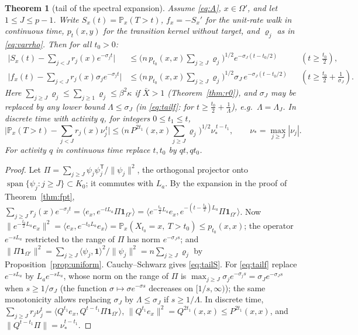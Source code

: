 \documentclass[11pt,a4paper]{article}
\DeclareMathOperator{\spn}{span}
\newcommand{\one}{\mathbf 1}
\newcommand{\PP}{\mathbb P}
\newcommand{\ip}[2]{\langle #1,#2\rangle}
\newcommand{\Xb}{\bar X}
\theoremstyle{plain}
\newtheorem{theorem}{Theorem}[section]
\theoremstyle{definition}
\numberwithin{equation}{section}
\begin{document}
\begin{theorem}[tail of the spectral expansion]\label{thm:tail}
Assume \eqref{eq:A}, $x\in\Omega'$, and let $1\le J\le p-1$. Write $S_x(t)=\PP_x(T>t)$, $f_x=-S_x'$ for the unit-rate walk in continuous time, $p_t(x,y)$ for the transition kernel without target, and $\varrho_j$ as in \eqref{eq:varrho}. Then for all $t_0>0$:
\begin{align}
\Big|S_x(t)-\sum_{j<J}r_j(x)e^{-\sigma_jt}\Big|&\le\Big(n\,p_{t_0}(x,x)\sum_{j\ge J}\varrho_j\Big)^{1/2}e^{-\sigma_J(t-t_0/2)}&&(t\ge\tfrac{t_0}2),\label{eq:tailS}\\
\Big|f_x(t)-\sum_{j<J}r_j(x)\sigma_je^{-\sigma_jt}\Big|&\le\Big(n\,p_{t_0}(x,x)\sum_{j\ge J}\varrho_j\Big)^{1/2}\sigma_J\,e^{-\sigma_J(t-t_0/2)}&&(t\ge\tfrac{t_0}2+\tfrac1{\sigma_J}).\label{eq:tailf}
\end{align}
Here $\sum_{j\ge J}\varrho_j\le\sum_{j\ge1}\varrho_j\le\beta^2\kappa$ if $\Xb>1$ (Theorem~\ref{thm:r0}), and $\sigma_J$ may be replaced by any lower bound $\Lambda\le\sigma_J$ (in \eqref{eq:tailf}: for $t\ge\frac{t_0}2+\frac1\Lambda$), e.g.\ $\Lambda=\Lambda_J$.
In discrete time with activity $q$, for integers $0\le t_1\le t$,
\begin{equation}\label{eq:taildisc}
\Big|\PP_x(T>t)-\sum_{j<J}r_j(x)\nu_j^{\,t}\Big|\le\Big(n\,P^{2t_1}(x,x)\sum_{j\ge J}\varrho_j\Big)^{1/2}\nu_*^{\,t-t_1},\qquad\nu_*=\max_{j\ge J}|\nu_j| .
\end{equation}
For activity $q$ in continuous time replace $t,t_0$ by $qt,qt_0$.
\end{theorem}
\begin{proof}
Let $\Pi=\sum_{j\ge J}\psi_j\psi_j^{\mathsf T}/\|\psi_j\|^2$, the orthogonal projector onto $\spn\{\psi_j:j\ge J\}\subset K_0$; it commutes with $L_a$. By the expansion in the proof of Theorem~\ref{thm:fpt}, $\sum_{j\ge J}r_j(x)e^{-\sigma_jt}=\ip{e_x}{e^{-tL_a}\Pi\one_{\Omega'}}=\ip{e^{-\frac{t_0}2L_a}e_x}{e^{-(t-\frac{t_0}2)L_a}\Pi\one_{\Omega'}}$. Now $\|e^{-\frac{t_0}2L_a}e_x\|^2=\ip{e_x}{e^{-t_0L_a}e_x}=\PP_x(X_{t_0}=x,\ T>t_0)\le p_{t_0}(x,x)$; the operator $e^{-sL_a}$ restricted to the range of $\Pi$ has norm $e^{-\sigma_Js}$; and $\|\Pi\one_{\Omega'}\|^2=\sum_{j\ge J}\ip{\psi_j}{\one}^2/\|\psi_j\|^2=n\sum_{j\ge J}\varrho_j$ by Proposition~\ref{prop:uniform}. Cauchy--Schwarz gives \eqref{eq:tailS}. For \eqref{eq:tailf} replace $e^{-sL_a}$ by $L_ae^{-sL_a}$, whose norm on the range of $\Pi$ is $\max_{j\ge J}\sigma_je^{-\sigma_js}=\sigma_Je^{-\sigma_Js}$ when $s\ge1/\sigma_J$ (the function $\sigma\mapsto\sigma e^{-\sigma s}$ decreases on $[1/s,\infty)$); the same monotonicity allows replacing $\sigma_J$ by $\Lambda\le\sigma_J$ if $s\ge1/\Lambda$. In discrete time, $\sum_{j\ge J}r_j\nu_j^t=\ip{Q^{t_1}e_x}{Q^{t-t_1}\Pi\one_{\Omega'}}$, $\|Q^{t_1}e_x\|^2=Q^{2t_1}(x,x)\le P^{2t_1}(x,x)$, and $\|Q^{t-t_1}\Pi\|=\nu_*^{t-t_1}$.
\end{proof}
\end{document}
